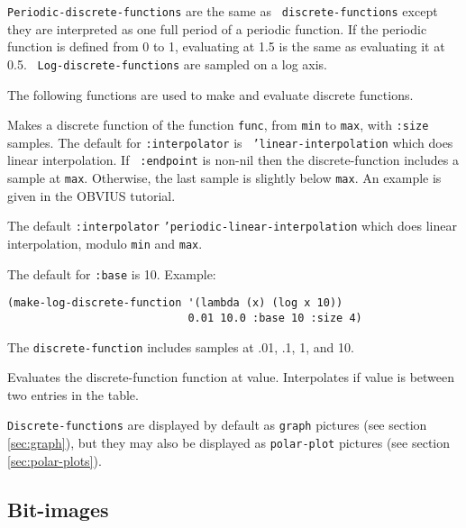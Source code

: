 {\tt Periodic-discrete-functions} are the same as {\tt
discrete-functions} except they are interpreted as one full period of
a periodic function.  If the periodic function is defined from 0 to 1,
evaluating at 1.5 is the same as evaluating it at 0.5.  {\tt
Log-discrete-functions} are sampled on a log axis.

The following functions are used to make and evaluate discrete
functions.  
\begin{description}
\item{} Makes a discrete function of the
function {\tt func}, from {\tt min} to {\tt max}, with {\tt :size}
samples.  The default for {\tt :interpolator} is {\tt
'linear-interpolation} which does linear interpolation.  If {\tt
:endpoint} is non-nil then the discrete-function includes a sample at
{\tt max}.  Otherwise, the last sample is slightly below {\tt max}.
An example is given in the OBVIUS tutorial.

\item{} 
The default {\tt :interpolator} {\tt 'periodic-linear-interpolation}
which does linear interpolation, modulo {\tt min} and {\tt max}.

\item{} 
The default for {\tt :base} is 10.  Example:
\begin{verbatim}
(make-log-discrete-function '(lambda (x) (log x 10)) 
                            0.01 10.0 :base 10 :size 4)
\end{verbatim}
The {\tt discrete-function} includes samples at .01, .1, 1, and 10.

\item{}
Evaluates the discrete-function function at value.  Interpolates if
value is between two entries in the table.
\end{description}

{\tt Discrete-functions} are displayed by default as {\tt graph}
pictures (see section \ref{sec:graph}), but they may also be displayed
as {\tt polar-plot} pictures (see section \ref{sec:polar-plots}).


\subsection{Bit-images}
\label{sec:bit-image}

